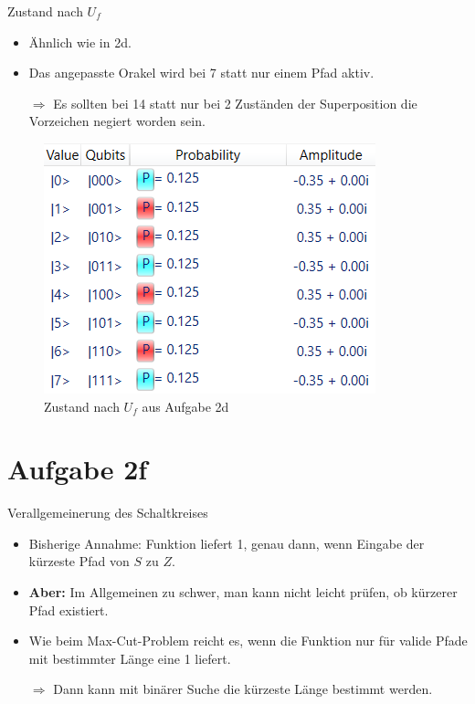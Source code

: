 \documentclass[fleqn,compress,utf8,aspectratio=169,t]{beamer}
\begin{document}
\begin{frame}{Zustand nach $U_f$}

\begin{minipage}[t]{.65\textwidth}
\begin{itemize}
	\item Ähnlich wie in 2d.
	\item Das angepasste Orakel wird bei 7 statt nur einem Pfad aktiv.
	\item[$\Rightarrow$] Es sollten bei 14 statt nur bei 2 Zuständen der Superposition die Vorzeichen negiert worden sein.
\end{itemize}

\end{minipage}%
\begin{minipage}[t]{.35\textwidth}
\begin{figure}
	\includegraphics[width=\textwidth]{images/2d-nach-UF.png}
	\caption{Zustand nach $U_f$ aus Aufgabe 2d}
\end{figure}
\end{minipage}
\end{frame}

\section{Aufgabe 2f}

\begin{frame}{Verallgemeinerung des Schaltkreises}
\begin{itemize}
	\item Bisherige Annahme: Funktion liefert 1, genau dann, wenn Eingabe der kürzeste Pfad von $S$ zu $Z$.
	\item \textbf{Aber:} Im Allgemeinen zu schwer, man kann nicht leicht prüfen, ob kürzerer Pfad existiert.
	\item Wie beim Max-Cut-Problem reicht es, wenn die Funktion nur für valide Pfade mit bestimmter Länge eine 1 liefert.
	\item[$\Rightarrow$] Dann kann mit binärer Suche die kürzeste Länge bestimmt werden.
\end{itemize}
\end{frame}
\end{document}
